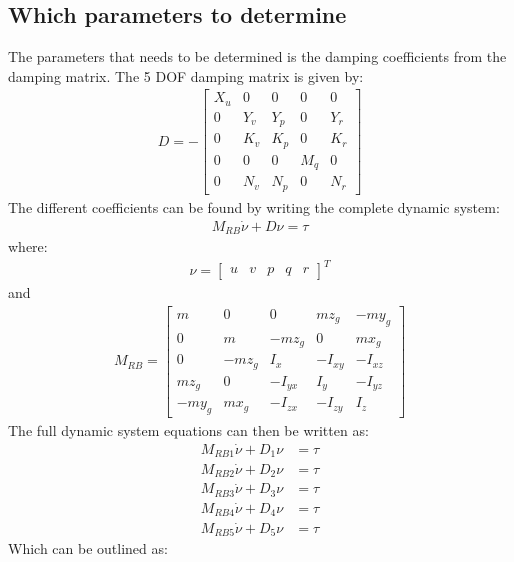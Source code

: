 \subsection{Which parameters to determine}
The parameters that needs to be determined is the damping coefficients from the damping matrix. The 5 \ac{DOF} damping matrix is given by:
\begin{align}
D = -
\begin{bmatrix}
X_u & 0 & 0 & 0 & 0\\
0 & Y_v & Y_p & 0 & Y_r\\
0 & K_v & K_p & 0 & K_r\\
0 & 0 & 0 & M_q & 0\\
0 & N_v & N_p & 0 & N_r
\end{bmatrix}
\end{align}
The different coefficients can be found by writing the complete dynamic system:
\begin{align}
M_{RB} \dot \nu + D\nu = \tau
\end{align}
where:
\begin{align}
\nu =
\begin{bmatrix}
u & v & p & q & r
\end{bmatrix}^T
\end{align}
and
\begin{align}
M_{RB} =
\begin{bmatrix}
m & 0 & 0 & mz_g & -my_g\\
0 & m & -mz_g & 0 & mx_g\\
0 & -mz_g & I_x & -I_{xy} & -I_{xz}\\
mz_g & 0 & -I_{yx} & I_y & -I_{yz}\\
-my_g & mx_g & -I_{zx} & -I_{zy} & I_z
\end{bmatrix}
\end{align}
The full dynamic system equations can then be written as:
\begin{align}
M_{RB1}\dot \nu + D_{1} \nu &= \tau\\
M_{RB2}\dot \nu + D_{2} \nu &= \tau\\
M_{RB3}\dot \nu + D_{3} \nu &= \tau\\
M_{RB4}\dot \nu + D_{4} \nu &= \tau\\
M_{RB5}\dot \nu + D_{5} \nu &= \tau
\end{align}
Which can be outlined as:
